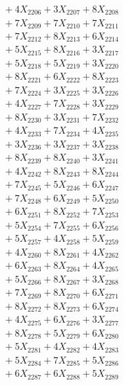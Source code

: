 \documentclass[a4paper,10pt]{article}
\begin{document}
{\begin{align}
&\;  + 4 X_{2206} + 3 X_{2207} + 8 X_{2208} \\[0.3ex]
&\;  + 7 X_{2209} + 7 X_{2210} + 7 X_{2211} \\[0.3ex]
&\;  + 7 X_{2212} + 8 X_{2213} + 6 X_{2214} \\[0.3ex]
&\;  + 5 X_{2215} + 8 X_{2216} + 3 X_{2217} \\[0.3ex]
&\;  + 5 X_{2218} + 5 X_{2219} + 3 X_{2220} \\[0.3ex]
&\;  + 8 X_{2221} + 6 X_{2222} + 8 X_{2223} \\[0.3ex]
&\;  + 7 X_{2224} + 3 X_{2225} + 3 X_{2226} \\[0.3ex]
&\;  + 4 X_{2227} + 7 X_{2228} + 3 X_{2229} \\[0.5ex]\allowbreak
&\;  + 8 X_{2230} + 3 X_{2231} + 7 X_{2232} \\[0.3ex]
&\;  + 4 X_{2233} + 7 X_{2234} + 4 X_{2235} \\[0.3ex]
&\;  + 3 X_{2236} + 3 X_{2237} + 3 X_{2238} \\[0.3ex]
&\;  + 8 X_{2239} + 8 X_{2240} + 3 X_{2241} \\[0.3ex]
&\;  + 4 X_{2242} + 8 X_{2243} + 8 X_{2244} \\[0.3ex]
&\;  + 7 X_{2245} + 5 X_{2246} + 6 X_{2247} \\[0.3ex]
&\;  + 7 X_{2248} + 6 X_{2249} + 5 X_{2250} \\[0.3ex]
&\;  + 6 X_{2251} + 8 X_{2252} + 7 X_{2253} \\[0.3ex]
&\;  + 5 X_{2254} + 7 X_{2255} + 6 X_{2256} \\[0.3ex]
&\;  + 5 X_{2257} + 4 X_{2258} + 5 X_{2259} \\[0.5ex]\allowbreak
&\;  + 4 X_{2260} + 8 X_{2261} + 4 X_{2262} \\[0.3ex]
&\;  + 6 X_{2263} + 8 X_{2264} + 4 X_{2265} \\[0.3ex]
&\;  + 5 X_{2266} + 8 X_{2267} + 3 X_{2268} \\[0.3ex]
&\;  + 7 X_{2269} + 8 X_{2270} + 6 X_{2271} \\[0.3ex]
&\;  + 8 X_{2272} + 8 X_{2273} + 6 X_{2274} \\[0.3ex]
&\;  + 4 X_{2275} + 6 X_{2276} + 3 X_{2277} \\[0.3ex]
&\;  + 8 X_{2278} + 5 X_{2279} + 6 X_{2280} \\[0.3ex]
&\;  + 5 X_{2281} + 4 X_{2282} + 4 X_{2283} \\[0.3ex]
&\;  + 5 X_{2284} + 7 X_{2285} + 5 X_{2286} \\[0.3ex]
&\;  + 6 X_{2287} + 6 X_{2288} + 5 X_{2289} \\[0.5ex]\allowbreak

\end{align}}
\end{document}
